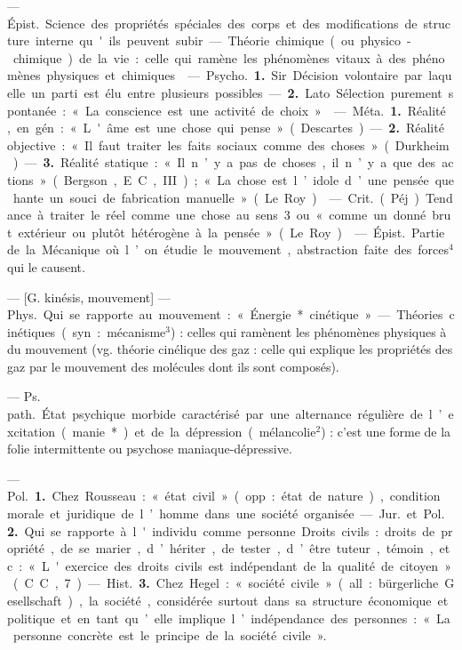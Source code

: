 \begin{itemize}[leftmargin=1cm, label=, itemsep=11pt]
 — \si{Épist.} Science des propriétés spéciales des corps et des
modifications de structure interne
qu'ils peuvent subir. — Théorie
chimique (ou physico-chimique) de
la vie : celle qui ramène les phénomènes vitaux à des phénomènes
physiques et chimiques.

 — \si{Psycho.} {\bf 1.} Sir. Décision volontaire par laquelle un parti est élu
entre plusieurs possibles. —  {\bf 2.} Lato.
Sélection purement spontanée :
« La conscience est une activité de
choix ».

 — \si{Méta.} {\bf 1.} Réalité, en gén. :
« L'âme est une chose qui pense »
(Descartes). —  {\bf 2.} Réalité objective :
« Il faut traiter les faits sociaux
comme des choses » (Durkheim). —
 {\bf 3.} Réalité statique : « Il n’y a pas
de choses, il n’y a que des actions »
(Bergson, E. C., III); « La chose est
l’idole d’une pensée que hante un
souci de fabrication manuelle »
(Le Roy).

 — \si{Crit.} (Péj.). Tendance à
traiter le réel comme une chose au
sens 3 ou « comme un donné brut
extérieur ou plutôt hétérogène à la
pensée » (Le Roy).

 — \si{Épist.} Partie de la
Mécanique où l’on étudie le mouvement, abstraction faite des forces$^4$
qui le causent.

 — [G. kinésis, mouvement] —
\si{Phys.} Qui se rapporte au mouvement : « Énergie* cinétique ». —
Théories cinétiques (syn. : mécanisme$^3$) : celles qui ramènent les
phénomènes physiques à du mouvement (vg. théorie cinélique des gaz :
celle qui explique les propriétés des
gaz par le mouvement des molécules
dont ils sont composés).

 — \si{Ps. path.} État
psychique morbide caractérisé par
une alternance régulière de l’excitation (manie*) et de la dépression
(mélancolie$^2$) : c’est une forme de la
folie intermittente ou psychose maniaque-dépressive.

 — \si{Pol.} {\bf 1.} Chez Rousseau : « état
civil » (opp. : état de nature), condition morale et juridique de l’homme
dans une société organisée.

— \si{Jur.} et \si{Pol.}  {\bf 2.} Qui se rapporte
à l'individu comme personne. Droits
civils : droits de propriété, de se
marier, d’hériter, de tester, d’être
tuteur, témoin, etc. : « L'exercice
des droits civils est indépendant de
la qualité de citoyen » (C. C., 7).

— \si{Hist.}  {\bf 3.} Chez Hegel : « société
civile » (all. : bürgerliche Gesellschaft),
la société, considérée surtout dans
sa structure économique et politique
et en tant qu’elle implique l’indépendance des personnes : « La personne concrète est le principe de la
société civile ».


\end{itemize}
